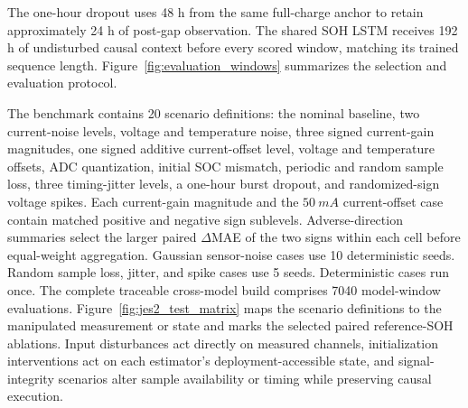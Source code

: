 \documentclass[review,nopreprintline]{elsarticle}
\begin{document}
The one-hour dropout uses 48 h from the same full-charge anchor to retain approximately 24 h of post-gap observation. The shared SOH LSTM receives 192 h of undisturbed causal context before every scored window, matching its trained sequence length. Figure~\ref{fig:evaluation_windows} summarizes the selection and evaluation protocol.

The benchmark contains 20 scenario definitions: the nominal baseline, two current-noise levels, voltage and temperature noise, three signed current-gain magnitudes, one signed additive current-offset level, voltage and temperature offsets, ADC quantization, initial SOC mismatch, periodic and random sample loss, three timing-jitter levels, a one-hour burst dropout, and randomized-sign voltage spikes. Each current-gain magnitude and the $\SI{50}{mA}$ current-offset case contain matched positive and negative sign sublevels. Adverse-direction summaries select the larger paired $\Delta$MAE of the two signs within each cell before equal-weight aggregation. Gaussian sensor-noise cases use 10 deterministic seeds. Random sample loss, jitter, and spike cases use 5 seeds. Deterministic cases run once. The complete traceable cross-model build comprises 7040 model-window evaluations. Figure~\ref{fig:jes2_test_matrix} maps the scenario definitions to the manipulated measurement or state and marks the selected paired reference-SOH ablations. Input disturbances act directly on measured channels, initialization interventions act on each estimator's deployment-accessible state, and signal-integrity scenarios alter sample availability or timing while preserving causal execution.
\end{document}
